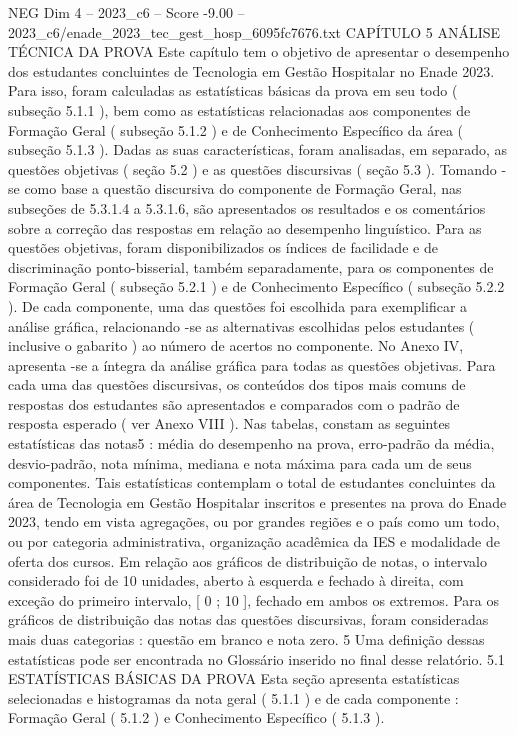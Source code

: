 \begin{textsample}{NEG Dim 4 – 2023\_c6 – Score -9.00 – 2023\_c6/enade\_2023\_tec\_gest\_hosp\_6095fc7676.txt}  \label{ex:f4_neg_011}
CAPÍTULO 5 ANÁLISE TÉCNICA DA PROVA Este capítulo tem o objetivo de apresentar o desempenho dos estudantes concluintes de Tecnologia em Gestão Hospitalar no Enade 2023.
Para isso, foram calculadas as estatísticas básicas da prova em seu todo ( subseção 5.1.1 ), bem como as estatísticas relacionadas aos componentes de Formação Geral ( subseção 5.1.2 ) e de Conhecimento Específico da área ( subseção 5.1.3 ).
Dadas as suas características, foram analisadas, em separado, as questões objetivas ( seção 5.2 ) e as questões discursivas ( seção 5.3 ).
Tomando -se como base a questão discursiva do componente de Formação Geral, nas subseções de 5.3.1.4 a 5.3.1.6, são apresentados os resultados e os comentários sobre a correção das respostas em relação ao desempenho linguístico.
Para as questões objetivas, foram disponibilizados os índices de facilidade e de discriminação ponto-bisserial, também separadamente, para os componentes de Formação Geral ( subseção 5.2.1 ) e de Conhecimento Específico ( subseção 5.2.2 ).
De cada componente, uma das questões foi escolhida para exemplificar a análise gráfica, relacionando -se as alternativas escolhidas pelos estudantes ( inclusive o gabarito ) ao número de acertos no componente.
No Anexo IV, apresenta -se a íntegra da análise gráfica para todas as questões objetivas.
Para cada uma das questões discursivas, os conteúdos dos tipos mais comuns de respostas dos estudantes são apresentados e comparados com o padrão de resposta esperado ( ver Anexo VIII ).
Nas tabelas, constam as seguintes estatísticas das notas5 : média do desempenho na prova, erro-padrão da média, desvio-padrão, nota mínima, mediana e nota máxima para cada um de seus componentes.
Tais estatísticas contemplam o total de estudantes concluintes da área de Tecnologia em Gestão Hospitalar inscritos e presentes na prova do Enade 2023, tendo em vista agregações, ou por grandes regiões e o país como um todo, ou por categoria administrativa, organização acadêmica da IES e modalidade de oferta dos cursos.
Em relação aos gráficos de distribuição de notas, o intervalo considerado foi de 10 unidades, aberto à esquerda e fechado à direita, com exceção do primeiro intervalo, [ 0 ; 10 ], fechado em ambos os extremos.
Para os gráficos de distribuição das notas das questões discursivas, foram consideradas mais duas categorias : questão em branco e nota zero. 5 Uma definição dessas estatísticas pode ser encontrada no Glossário inserido no final desse relatório. 5.1 ESTATÍSTICAS BÁSICAS DA PROVA Esta seção apresenta estatísticas selecionadas e histogramas da nota geral ( 5.1.1 ) e de cada componente : Formação Geral ( 5.1.2 ) e Conhecimento Específico ( 5.1.3 ).

\end{textsample}
